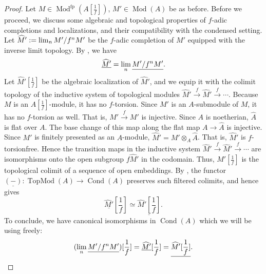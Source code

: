 \documentclass[11pt]{amsart}
\newcommand{\eq}[2]{\begin{equation}\label{#1}#2 \end{equation}}
\newcommand{\ra}{\rightarrow} %
\newcommand{\xra}{\xrightarrow}
\newcommand{\Mod}{\operatorname{Mod}}
\newcommand{\TopMod}{\operatorname{TopMod}}
\renewcommand{\lim}{\operatornamewithlimits{\rm{lim}}}
\newcommand{\fp}{\operatorname{{fp}}}
\newcommand{\Cond}{\operatorname{Cond}}
\renewcommand{\hat}{\widehat} %
\newcommand{\ul}{\underline}
\theoremstyle{plain}
\theoremstyle{definition}
\numberwithin{equation}{prop}
\begin{document}
\begin{proof}
Let  $M\in \Mod^{\fp}(A[\frac{1}{f}])$, $M'\in \Mod(A)$ be as before. 
Before we proceed, we discuss some algebraic and topological properties of $f$-adic completions and localizations, and their compatibility with the condensed setting.
Let $\hat M' := \lim_n M'/f^nM'$ be the $f$-adic completion of $M'$ equipped with the inverse limit topology.
By , we have 
$$\ul{\hat M'} = \lim_n \ul{M'/f^nM'}.$$
Let $\hat M'[\frac{1}{f}]$ be the algebraic localization of $\hat M'$, and we equip it with the colimit topology of the inductive system of topological modules $\hat M'\xra{f}\hat M'\xra{f}\cdots$.
Because $M$ is an $A[\frac{1}{f}]$-module, it has no $f$-torsion.
Since $M'$ is an $A$-submodule of $M$, it has no $f$-torsion  as well. 
That is, $M'\xra{f} M'$ is injective. 
Since $A$ is noetherian, $\hat A$ is flat over $A$.
The base change of this map along the flat map $A\ra \hat A$ is injective.
Since $M'$ is finitely presented as an $A$-module, $\hat M'=M'\otimes_A \hat A$.
That is, $\hat M'$ is $f$-torsionfree.
Hence the transition maps in the inductive system $\hat M' \xrightarrow{f} \hat M' \xrightarrow{f} \cdots$ are isomorphisms onto the open subgroup $f\hat M'$ in the codomain.
Thus, $\hat M'[\frac{1}{f}]$ is the topological colimit of a sequence of open embeddings. 
By ,
the functor $\ul{(-)}: \TopMod(A) \to \Cond(A)$ preserves such filtered colimits, and hence gives
$$\ul{\hat M'}[\frac{1}{f}] \simeq \ul{\hat M'[\frac{1}{f}]}.$$
To conclude, we have canonical isomorphisms in $\Cond(A)$ which we will be using freely:
\eq{thmeqCSblue}{ (\lim_n \ul{M'/f^nM'})[\frac{1}{f}] = \ul{\hat M'}[\frac{1}{f}]= \ul{\hat M'[\frac{1}{f}]}. }


\end{proof}
\end{document}
